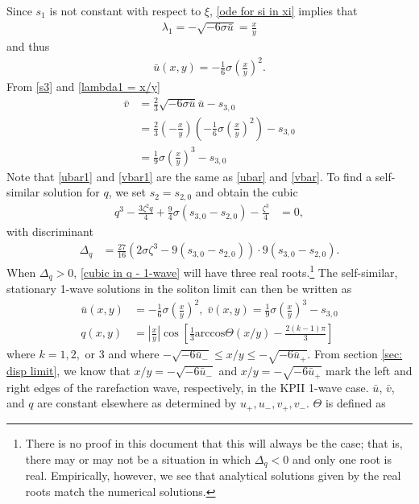 \documentclass[12pt]{article}
\numberwithin{equation}{section}
\begin{document}
Since $s_1$ is not constant with respect to $\xi$, \eqref{ode for si in xi} implies that
\begin{align}
    \lambda_1 = -\sqrt{-6\sigma\bar u} = \frac{x}{y} \label{lambda1 = x/y}
\end{align}
and thus 
\begin{align}
    \bar u(x,y) = -\frac{1}{6}\sigma\left(\frac{x}{y}\right)^2. \label{ubar1}
\end{align}
From \eqref{s3} and \eqref{lambda1 = x/y}
\begin{align}
    \bar v &= \frac{2}{3}\sqrt{-6\sigma \bar u}\bar u - s_{3,0} \nonumber\\
    &= \frac{2}{3}\left(-\frac{x}{y}\right)\left(-\frac{1}{6}\sigma\left(\frac{x}{y}\right)^2\right) - s_{3,0} \nonumber\\
    &= \frac{1}{9}\sigma\left(\frac{x}{y}\right)^3 - s_{3,0} \label{vbar1}
\end{align}
Note that \eqref{ubar1} and \eqref{vbar1} are the same as \eqref{ubar} and \eqref{vbar}. To find a self-similar solution for $q$, we set $s_2 = s_{2,0}$ and obtain the cubic
\begin{align}
    q^3-\frac{3 \zeta ^2 q}{4}+\frac{9}{4} \sigma  \left(s_{3,0}-s_{2,0}\right)-\frac{\zeta ^3}{4} &= 0, \label{cubic in q - 1-wave}
\end{align}
with discriminant
\begin{align}
    \Delta_q &= \frac{27}{16}\left(2\sigma \zeta^3 - 9(s_{3,0}-s_{2,0})\right)\cdot 9(s_{3,0}-s_{2,0}).
    \label{disc of cubic in q 1}
\end{align}
When $\Delta_q >0$, \eqref{cubic in q - 1-wave} will have three real roots.\footnote{There is no proof in this document that this will always be the case; that is, there may or may not be a situation in which $\Delta_q<0$ and only one root is real. Empirically, however, we see that analytical solutions given by the real roots match the numerical solutions.} The self-similar, stationary 1-wave solutions in the soliton limit can then be written as
\begin{align}
    \bar u(x,y) &= -\frac{1}{6}\sigma\left(\frac{x}{y}\right)^2, \;
    \bar v(x,y) = \frac{1}{9}\sigma\left(\frac{x}{y}\right)^3 - s_{3,0} \\
    q(x,y) &= \left|\frac{x}{y}\right|\cos\left[\frac{1}{3}\mathrm{arccos}\Theta(x/y) - \frac{2(k-1)\pi}{3}\right] 
\end{align}
where $k=1,2,$ or $3$ and where $-\sqrt{-6\bar u_-} \leq x/y \leq -\sqrt{-6\bar u_+}$. From section \ref{sec: disp limit}, we know that $x/y = -\sqrt{-6\bar u_-}$ and $x/y=-\sqrt{-6\bar u_+}$ mark the left and right edges of the rarefaction wave, respectively, in the KPII 1-wave case. $\bar u$, $\bar v$, and $q$ are constant elsewhere as determined by $u_+,u_-,v_+,v_-$. $\Theta$ is defined as 
\end{document}
